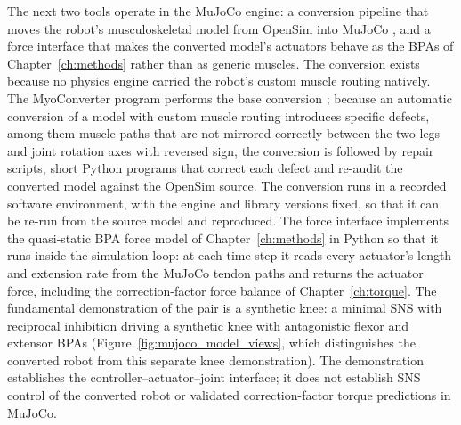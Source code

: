The next two tools operate in the MuJoCo engine: a conversion pipeline that moves the robot's musculoskeletal model from OpenSim into MuJoCo \citep{delp_opensim_2007, todorov_mujoco_2012}, and a force interface that makes the converted model's actuators behave as the BPAs of Chapter~\ref{ch:methods} rather than as generic muscles. The conversion exists because no physics engine carried the robot's custom muscle routing natively. The MyoConverter program performs the base conversion \citep{caggiano_myosuite_2022, wang_myosim_2022}; because an automatic conversion of a model with custom muscle routing introduces specific defects, among them muscle paths that are not mirrored correctly between the two legs and joint rotation axes with reversed sign, the conversion is followed by repair scripts, short Python programs that correct each defect and re-audit the converted model against the OpenSim source. The conversion runs in a recorded software environment, with the engine and library versions fixed, so that it can be re-run from the source model and reproduced. The force interface implements the quasi-static BPA force model of Chapter~\ref{ch:methods} in Python so that it runs inside the simulation loop: at each time step it reads every actuator's length and extension rate from the MuJoCo tendon paths and returns the actuator force, including the correction-factor force balance of Chapter~\ref{ch:torque}. The fundamental demonstration of the pair is a synthetic knee: a minimal SNS with reciprocal inhibition driving a synthetic knee with antagonistic flexor and extensor BPAs (Figure~\ref{fig:mujoco_model_views}, which distinguishes the converted robot from this separate knee demonstration). The demonstration establishes the controller--actuator--joint interface; it does not establish SNS control of the converted robot or validated correction-factor torque predictions in MuJoCo.

